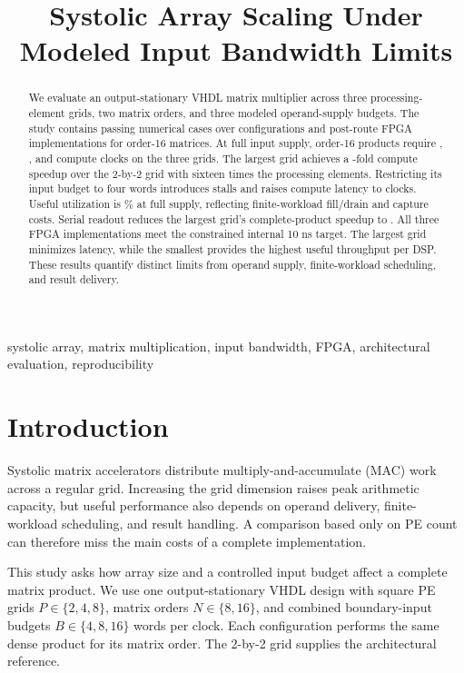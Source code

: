 \documentclass[conference]{IEEEtran}
\title{Systolic Array Scaling Under Modeled Input Bandwidth Limits}
\author{\IEEEauthorblockN{Ozlem Polat, Thomas Martin, and Keith Kamer}\IEEEauthorblockA{University of Florida}}
\begin{document}
\maketitle
\begin{abstract}
We evaluate an output-stationary VHDL matrix multiplier across three processing-element grids, two matrix orders, and three modeled operand-supply budgets. The study contains \SimulationCases{} passing numerical cases over \SimulationConfigurations{} configurations and \HardwareConfigurations{} post-route FPGA implementations for order-16 matrices. At full input supply, order-16 products require \ComputeLargeTwo{}, \ComputeLargeFour{}, and \ComputeLargeEight{} compute clocks on the three grids. The largest grid achieves a \WideSpeedup{}-fold compute speedup over the 2-by-2 grid with sixteen times the processing elements. Restricting its input budget to four words introduces \LimitedStalls{} stalls and raises compute latency to \LimitedCompute{} clocks. Useful utilization is \WideUtilization{}\% at full supply, reflecting finite-workload fill/drain and capture costs. Serial readout reduces the largest grid's complete-product speedup to \LargeEndSpeedup{}. All three FPGA implementations meet the constrained internal 10 ns target. The largest grid minimizes latency, while the smallest provides the highest useful throughput per DSP. These results quantify distinct limits from operand supply, finite-workload scheduling, and result delivery.
\end{abstract}
\begin{IEEEkeywords}
systolic array, matrix multiplication, input bandwidth, FPGA, architectural evaluation, reproducibility
\end{IEEEkeywords}

\section{Introduction}
Systolic matrix accelerators distribute multiply-and-accumulate (MAC) work across a regular grid. Increasing the grid dimension raises peak arithmetic capacity, but useful performance also depends on operand delivery, finite-workload scheduling, and result handling. A comparison based only on PE count can therefore miss the main costs of a complete implementation.

This study asks how array size and a controlled input budget affect a complete matrix product. We use one output-stationary VHDL design with square PE grids $P\in\{2,4,8\}$, matrix orders $N\in\{8,16\}$, and combined boundary-input budgets $B\in\{4,8,16\}$ words per clock. Each configuration performs the same dense product for its matrix order. The 2-by-2 grid supplies the architectural reference.
\end{document}
